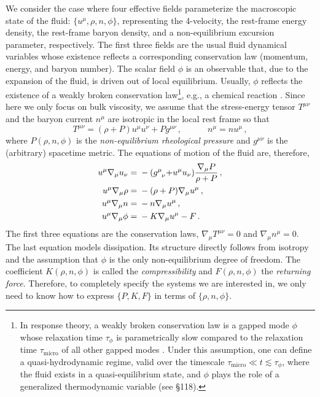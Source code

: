 \documentclass[aps,prl,noshowpacs,noshowkeys,floatfix,superscriptaddress,singlecolum,nofootinbib]{revtex4-2}
\newcommand{\spc}{\quad \quad \quad}
\theoremstyle{definition}
\theoremstyle{theorem}
\begin{document}
We consider the case where four effective fields parameterize the macroscopic state of the fluid: $\{u^\mu,\rho,n,\phi \}$, representing the 4-velocity, the rest-frame energy density, the rest-frame baryon density, and a non-equilibrium excursion parameter, respectively. The first three fields are the usual fluid dynamical variables whose existence reflects a corresponding conservation law (momentum, energy, and baryon number). The scalar field $\phi$ is an observable that, due to the expansion of the fluid, is driven out of local equilibrium.  Usually, $\phi$ reflects the existence of a weakly broken conservation law\footnote{In response theory, a weakly broken conservation law is a gapped mode $\phi$ whose relaxation time $\tau_\phi$ is parametrically slow compared to the relaxation time $\tau_{\text{micro}}$ of all other gapped modes \cite{Grozdanov2019,GavassinoNonHydro2022}. Under this assumption, one can define a quasi-hydrodynamic regime, valid over the timescale $\tau_{\text{micro}} \ll t \lesssim \tau_\phi$, where the fluid exists in a quasi-equilibrium state, and $\phi$ plays the role of a generalized thermodynamic variable (see \cite{landau5} \S 118).}, e.g., a chemical reaction \cite{GavassinoFronntiers2021}. Since here we only focus on bulk viscosity, we assume that the stress-energy tensor $T^{\mu \nu}$ and the baryon current $n^\mu$ are isotropic in the local rest frame so that \cite{MTW_book}
\begin{equation}
    T^{\mu \nu} = (\rho+P)u^\mu u^\nu + Pg^{\mu \nu} \, , \spc n^\mu = nu^\mu \, ,
\end{equation}
where $P(\rho,n,\phi)$ is the \emph{non-equilibrium rheological pressure} and $g^{\mu\nu}$ is the (arbitrary) spacetime metric. The equations of motion of the fluid are, therefore,
\begin{equation}\label{sbam}
\begin{split}
u^\mu \nabla_\mu u_\nu={}& - (g\indices{^\mu _\nu}{+}u^\mu u_\nu) \dfrac{\nabla_\mu P}{\rho+P} \, , \\
   u^\mu \nabla_\mu\rho={}& -(\rho+P)\nabla_\mu u^\mu \, , \\
   u^\mu \nabla_\mu n={}& -n\nabla_\mu u^\mu \, , \\
   u^\mu \nabla_\mu \phi ={}& -K \nabla_\mu u^\mu -F \, . \\
\end{split}
\end{equation}
The first three equations are the conservation laws, $\nabla_\mu T^{\mu \nu}=0$ and $\nabla_\mu n^\mu=0$. The last equation models dissipation. Its structure directly follows from isotropy and the assumption that $\phi$ is the only non-equilibrium degree of freedom. The coefficient $K(\rho,n,\phi)$ is called the \emph{compressibility} and $F(\rho,n,\phi)$ the \emph{returning force}. Therefore, to completely specify the systems we are interested in, we only need to know how to express $\{P,K,F\}$ in terms of $\{\rho,n,\phi\}$.
\end{document}

